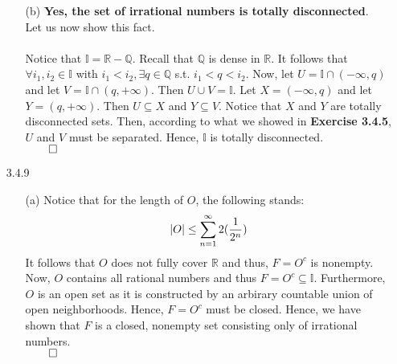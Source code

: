 \documentclass[11pt]{article}
\DeclarePairedDelimiter\abs{\lvert}{\rvert}%
\newcommand{\reals}{\mathbb{R}}
\newcommand{\rats}{\mathbb{Q}}
\newcommand{\irrats}{\mathbb{I}}
\begin{document}
\begin{itemize}
\begin{itemize}
            \item[(b)]
                \textbf{Yes, the set of irrational numbers is totally
                disconnected}.
                \\
                Let us now show this fact.
                \\
                \\
                Notice that $\irrats = \reals - \rats$. Recall that $\rats$ is
                dense in $\reals$. It follows that $\forall i_1, i_2 \in
                \irrats$ with $i_1 < i_2, \exists q \in \rats$ s.t. $i_1 < q <
                i_2$. Now, let $U = \irrats \cap (-\infty, q)$ and let $V =
                \irrats \cap (q, +\infty)$. Then $U \cup V = \irrats$. Let $X =
                (-\infty, q)$ and let $Y = (q, +\infty)$. Then $U \subseteq X$
                and $Y \subseteq V$. Notice that $X$ and $Y$ are totally
                disconnected sets. Then, according to what we showed in
                \textbf{Exercise 3.4.5}, $U$ and $V$ must be separated. Hence,
                $\irrats$ is totally disconnected.\\
                $\qed$
        \end{itemize}

    \item[3.4.9]
        \begin{itemize}
            \item[(a)]
                Notice that for the length of $O$, the following stands:
                \begin{equation*}
                    \abs{O} \leq \sum_{n = 1}^\infty 2(\dfrac{1}{2^n})
                \end{equation*}
                It follows that $O$ does not fully cover $\reals$ and thus, $F
                = O^c$ is nonempty. Now, $O$ contains all rational numbers and
                thus $F = O^c \subseteq \irrats$. Furthermore, $O$ is an open
                set as it is constructed by an arbirary countable union of open
                neighborhoods. Hence, $F = O^c$ must be closed. Hence, we have
                shown that $F$ is a closed, nonempty set consisting only of
                irrational numbers.\\
                $\qed$


\end{itemize}
\end{itemize}
\end{document}
